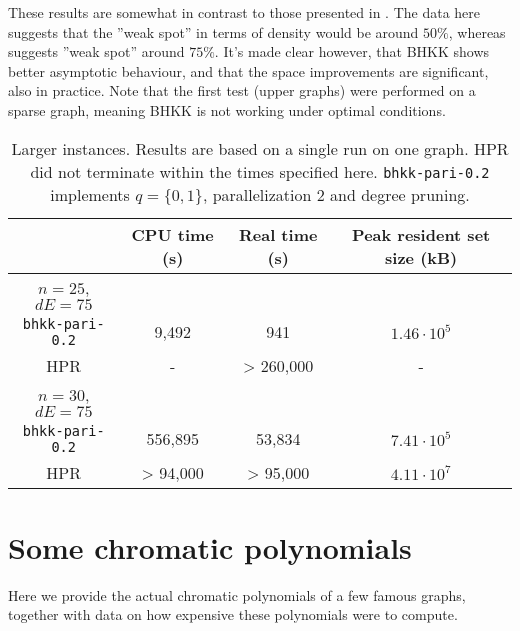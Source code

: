\documentclass[a4paper]{article}
\newcommand{\code}{\texttt}
\begin{document}
These results are somewhat in contrast to those presented in \cite{haggard}. The data here suggests that the ''weak spot'' in terms of density would be around $50\%$, whereas \cite{haggard} suggests ''weak spot'' around $75\%$. It's made clear however, that BHKK shows better asymptotic behaviour, and that the space improvements are significant, also in practice. Note that the first test (upper graphs) were performed on a sparse graph, meaning BHKK is not working under optimal conditions.

\begin{table}[H]\centering
\begin{tabular}{|c|c|c|c|} \hline
  & CPU time (s) & Real time (s) & Peak resident set size (kB) \\ \hline
  $n = 25$, $dE = 75$ & & & \\ \hline
  \code{bhkk-pari-0.2} & 9,492 & 941 & $1.46 \cdot 10^{5}$ \\ \hline
  HPR & - & > 260,000 & - \\ \hline
  $n = 30$, $dE = 75$ &  &  &  \\ \hline
  \code{bhkk-pari-0.2} & 556,895 & 53,834 & $7.41 \cdot 10^{5}$ \\ \hline
  HPR & > 94,000 & > 95,000 & $4.11 \cdot 10^{7}$ \\ \hline
\end{tabular}
\caption{Larger instances. Results are based on a single run on one graph. HPR did not terminate within the times specified here. \code{bhkk-pari-0.2} implements $q = \{0, 1\}$, parallelization 2 and degree pruning.}
\end{table}

\section{Some chromatic polynomials}
Here we provide the actual chromatic polynomials of a few famous graphs, together with data on how expensive these polynomials were to compute.
\end{document}
